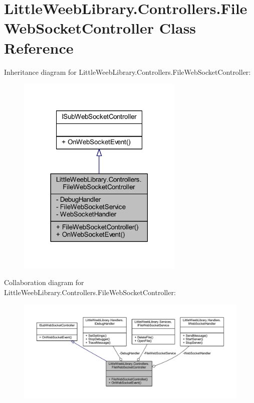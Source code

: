 \hypertarget{class_little_weeb_library_1_1_controllers_1_1_file_web_socket_controller}{}\section{Little\+Weeb\+Library.\+Controllers.\+File\+Web\+Socket\+Controller Class Reference}
\label{class_little_weeb_library_1_1_controllers_1_1_file_web_socket_controller}


Inheritance diagram for Little\+Weeb\+Library.\+Controllers.\+File\+Web\+Socket\+Controller\+:\nopagebreak
\begin{figure}[H]
\begin{center}
\leavevmode
\includegraphics[width=225pt]{class_little_weeb_library_1_1_controllers_1_1_file_web_socket_controller__inherit__graph}
\end{center}
\end{figure}


Collaboration diagram for Little\+Weeb\+Library.\+Controllers.\+File\+Web\+Socket\+Controller\+:\nopagebreak
\begin{figure}[H]
\begin{center}
\leavevmode
\includegraphics[width=350pt]{class_little_weeb_library_1_1_controllers_1_1_file_web_socket_controller__coll__graph}
\end{center}
\end{figure}
